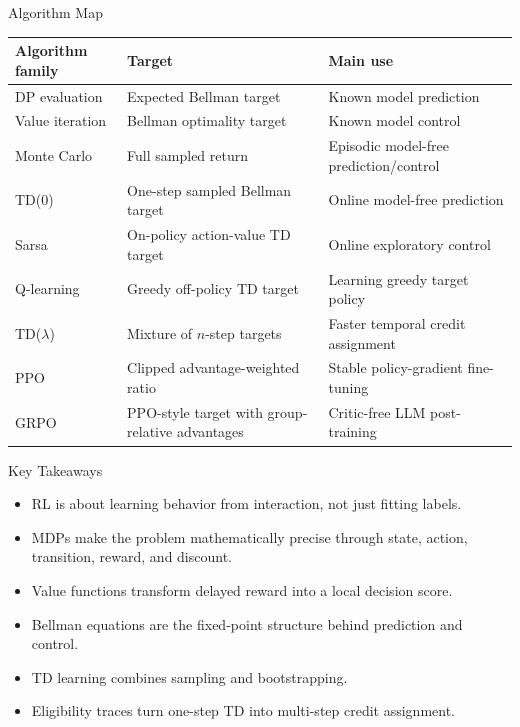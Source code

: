 \documentclass[aspectratio=169]{beamer}
\begin{document}
\begin{frame}{Algorithm Map}
\small
\begin{tabular}{>{\raggedright\arraybackslash}p{}
                >{\raggedright\arraybackslash}p{}
                >{\raggedright\arraybackslash}p{}}
\toprule
Algorithm family & Target & Main use \\
\midrule
DP evaluation & Expected Bellman target & Known model prediction \\
Value iteration & Bellman optimality target & Known model control \\
Monte Carlo & Full sampled return & Episodic model-free prediction/control \\
TD(0) & One-step sampled Bellman target & Online model-free prediction \\
Sarsa & On-policy action-value TD target & Online exploratory control \\
Q-learning & Greedy off-policy TD target & Learning greedy target policy \\
TD($\lambda$) & Mixture of $n$-step targets & Faster temporal credit assignment \\
PPO & Clipped advantage-weighted ratio & Stable policy-gradient fine-tuning \\
GRPO & PPO-style target with group-relative advantages & Critic-free LLM post-training \\
\bottomrule
\end{tabular}
\end{frame}

\begin{frame}{Key Takeaways}
\small
\begin{itemize}
    \item RL is about learning behavior from interaction, not just fitting labels.
    \item MDPs make the problem mathematically precise through state, action, transition, reward, and discount.
    \item Value functions transform delayed reward into a local decision score.
    \item Bellman equations are the fixed-point structure behind prediction and control.
    \item TD learning combines sampling and bootstrapping.
    \item Eligibility traces turn one-step TD into multi-step credit assignment.
\end{itemize}
\end{frame}
\end{document}
